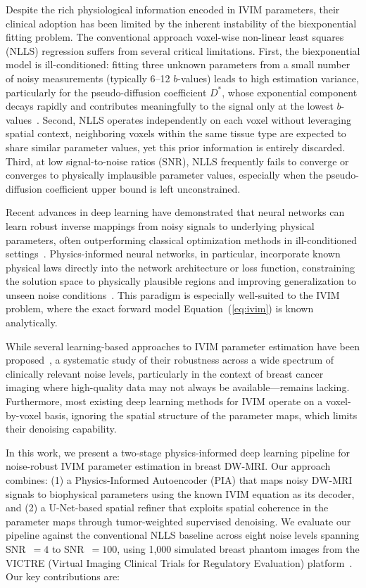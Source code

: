 \documentclass[12pt]{article}
\begin{document}
Despite the rich physiological information encoded in IVIM parameters, their clinical adoption has been limited by the inherent instability of the biexponential fitting problem. The conventional approach voxel-wise non-linear least squares (NLLS) regression suffers from several critical limitations. First, the biexponential model is ill-conditioned: fitting three unknown parameters from a small number of noisy measurements (typically 6--12 $b$-values) leads to high estimation variance, particularly for the pseudo-diffusion coefficient $D^{*}$, whose exponential component decays rapidly and contributes meaningfully to the signal only at the lowest $b$-values~\cite{bertleff2017}. Second, NLLS operates independently on each voxel without leveraging spatial context, neighboring voxels within the same tissue type are expected to share similar parameter values, yet this prior information is entirely discarded. Third, at low signal-to-noise ratios (SNR), NLLS frequently fails to converge or converges to physically implausible parameter values, especially when the pseudo-diffusion coefficient upper bound is left unconstrained.

Recent advances in deep learning have demonstrated that neural networks can learn robust inverse mappings from noisy signals to underlying physical parameters, often outperforming classical optimization methods in ill-conditioned settings~\cite{barbieri2020,kaandorp2021}. Physics-informed neural networks, in particular, incorporate known physical laws directly into the network architecture or loss function, constraining the solution space to physically plausible regions and improving generalization to unseen noise conditions~\cite{raissi2019}. This paradigm is especially well-suited to the IVIM problem, where the exact forward model Equation~(\ref{eq:ivim}) is known analytically.

While several learning-based approaches to IVIM parameter estimation have been proposed~\cite{barbieri2020,kaandorp2021}, a systematic study of their robustness across a wide spectrum of clinically relevant noise levels, particularly in the context of breast cancer imaging where high-quality data may not always be available---remains lacking. Furthermore, most existing deep learning methods for IVIM operate on a voxel-by-voxel basis, ignoring the spatial structure of the parameter maps, which limits their denoising capability.

In this work, we present a two-stage physics-informed deep learning pipeline for noise-robust IVIM parameter estimation in breast DW-MRI. Our approach combines: (1) a Physics-Informed Autoencoder (PIA) that maps noisy DW-MRI signals to biophysical parameters using the known IVIM equation as its decoder, and (2) a U-Net-based spatial refiner that exploits spatial coherence in the parameter maps through tumor-weighted supervised denoising. We evaluate our pipeline against the conventional NLLS baseline across eight noise levels spanning SNR~$= 4$ to SNR~$= 100$, using 1,000 simulated breast phantom images from the VICTRE (Virtual Imaging Clinical Trials for Regulatory Evaluation) platform~\cite{badano2018}. Our key contributions are:
\end{document}

